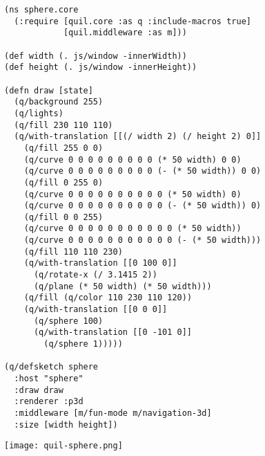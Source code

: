 \documentclass{article}
\begin{document}
\begin{verbatim}
(ns sphere.core
  (:require [quil.core :as q :include-macros true]
            [quil.middleware :as m]))

(def width (. js/window -innerWidth))
(def height (. js/window -innerHeight))

(defn draw [state]
  (q/background 255)
  (q/lights)
  (q/fill 230 110 110)
  (q/with-translation [[(/ width 2) (/ height 2) 0]]
    (q/fill 255 0 0)
    (q/curve 0 0 0 0 0 0 0 0 0 (* 50 width) 0 0)
    (q/curve 0 0 0 0 0 0 0 0 0 (- (* 50 width)) 0 0)
    (q/fill 0 255 0)
    (q/curve 0 0 0 0 0 0 0 0 0 0 (* 50 width) 0)
    (q/curve 0 0 0 0 0 0 0 0 0 0 (- (* 50 width)) 0)
    (q/fill 0 0 255)
    (q/curve 0 0 0 0 0 0 0 0 0 0 0 (* 50 width))
    (q/curve 0 0 0 0 0 0 0 0 0 0 0 (- (* 50 width)))
    (q/fill 110 110 230)
    (q/with-translation [[0 100 0]]
      (q/rotate-x (/ 3.1415 2))
      (q/plane (* 50 width) (* 50 width)))
    (q/fill (q/color 110 230 110 120))
    (q/with-translation [[0 0 0]]
      (q/sphere 100)
      (q/with-translation [[0 -101 0]]
        (q/sphere 1)))))

(q/defsketch sphere
  :host "sphere"
  :draw draw
  :renderer :p3d
  :middleware [m/fun-mode m/navigation-3d]
  :size [width height])
\end{verbatim}
\begin{center}
\texttt{[image: quil-sphere.png]}
\end{center}
\end{document}

